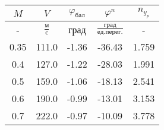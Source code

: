 \begin{tabular}{|c|c|c|c|c|}
\hline
$M$ & $V$ & $\varphi_{бал}$ & $\varphi^{n}$ & $n_{y_{p}}$ \\ 
\hline
- & $\frac{м}{с}$ & град & $\frac{град}{ед.перег.}$ & - \\ 
\hline
0.35 & 111.0 & -1.36 & -36.43 & 1.759 \\ 
\hline
0.4 & 127.0 & -1.22 & -28.03 & 1.991 \\ 
\hline
0.5 & 159.0 & -1.06 & -18.13 & 2.541 \\ 
\hline
0.6 & 190.0 & -0.99 & -13.01 & 3.153 \\ 
\hline
0.7 & 222.0 & -0.97 & -10.09 & 3.778 \\ 
\hline
\end{tabular}